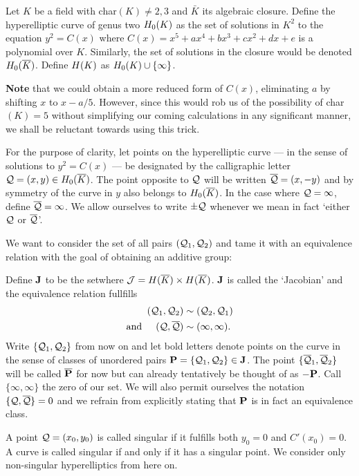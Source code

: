 \begin{defin}
	Let $K$ be a field with char$(K) \neq 2, 3$ and $\bar K$ its algebraic closure. Define the hyperelliptic curve of genus two $\enk$ as the set of solutions in $K^2$ to the equation $y^2=C(x)$ where $C(x)=x^5+ax^4+bx^3+cx^2+dx+e$ is a polynomial over $K$. Similarly, the set of solutions in the closure would be denoted $\enkb$.	Define $\ek$ as $\enk \cup \{ \infty \}$.

	\textbf{Note} that we could obtain a more reduced form of $C(x)$, eliminating $a$ by shifting $x$ to $x-a/5$. However, since this would rob us of the possibility of char$(K) = 5$ without simplifying our coming calculations in any significant manner, we shall be reluctant towards using this trick.

	For the purpose of clarity, let points on the hyperelliptic curve --- in the sense of solutions to $y^2=C(x)$ --- be designated by the calligraphic letter $\q=(x,y) \in \enkb$. The point opposite to $\q$ will be written $\bar \q = (x,-y)$ and by symmetry of the curve in $y$ also belongs to $\enkb$. In the case where $\q = \infty$, define $\bar \q = \infty$. We allow ourselves to write $\pm \q$ whenever we mean in fact `either $\q$ or $\bar \q$'.

	We want to consider the set of all pairs $(\q_1,\q_2)$ and tame it with an equivalence relation with the goal of obtaining an additive group:
\end{defin}
\begin{defin}\label{defj}
	Define $\J$ to be the set\scalebox{1.3}{ $\nicefrac{ \j }{\sim }$ }where $\j = \ekb \times \ekb$. $\J$ is called the `Jacobian' and the equivalence relation fullfills
	\begin{align*}
		(\q_1,\q_2) &\sim (\q_2,\q_1) \\
		\text{and\hspace{5mm}} (\q,\bar \q) & \sim ( \infty , \infty ). 
	\end{align*}
	Write $\{ \q_1,\q_2 \}$ from now on and let bold letters denote points on the curve in the sense of classes of unordered pairs $\P =\{ \q_1, \q_2 \} \in \J$. The point $\{ \bar \q_1, \bar \q_2 \}$ will be called $\bar \P$ for now but can already tentatively be thought of as $-\P$. Call $\{ \infty, \infty \}$ the zero of our set. We will also permit ourselves the notation $\{ \q,\bar \q \} = 0$ and we refrain from explicitly stating that $\P$ is in fact an equivalence class.

	A point $\q = (x_0,y_0)$ is called singular if it fulfills both $y_0=0$ and $C'(x_0) = 0$. A curve is called singular if and only if it has a singular point. We consider only non-singular hyperelliptics from here on.
\end{defin}

